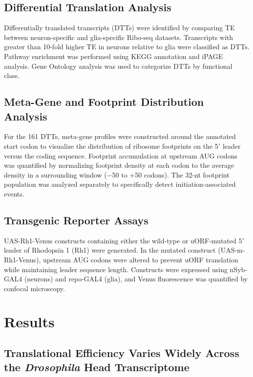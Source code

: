 \documentclass[12pt]{article}
\begin{document}
\subsection{Differential Translation Analysis}

Differentially translated transcripts (DTTs) were identified by comparing TE between neuron-specific and glia-specific Ribo-seq datasets. Transcripts with greater than 10-fold higher TE in neurons relative to glia were classified as DTTs. Pathway enrichment was performed using KEGG annotation and iPAGE analysis. Gene Ontology analysis was used to categorize DTTs by functional class.

\subsection{Meta-Gene and Footprint Distribution Analysis}

For the 161 DTTs, meta-gene profiles were constructed around the annotated start codon to visualize the distribution of ribosome footprints on the 5$'$ leader versus the coding sequence. Footprint accumulation at upstream AUG codons was quantified by normalizing footprint density at each codon to the average density in a surrounding window ($-$50 to $+$50 codons). The 32-nt footprint population was analyzed separately to specifically detect initiation-associated events.

\subsection{Transgenic Reporter Assays}

UAS-Rh1-Venus constructs containing either the wild-type or uORF-mutated 5$'$ leader of Rhodopsin 1 (Rh1) were generated. In the mutated construct (UAS-m-Rh1-Venus), upstream AUG codons were altered to prevent uORF translation while maintaining leader sequence length. Constructs were expressed using nSyb-GAL4 (neurons) and repo-GAL4 (glia), and Venus fluorescence was quantified by confocal microscopy.

\section{Results}

\subsection{Translational Efficiency Varies Widely Across the \textit{Drosophila} Head Transcriptome}
\end{document}
